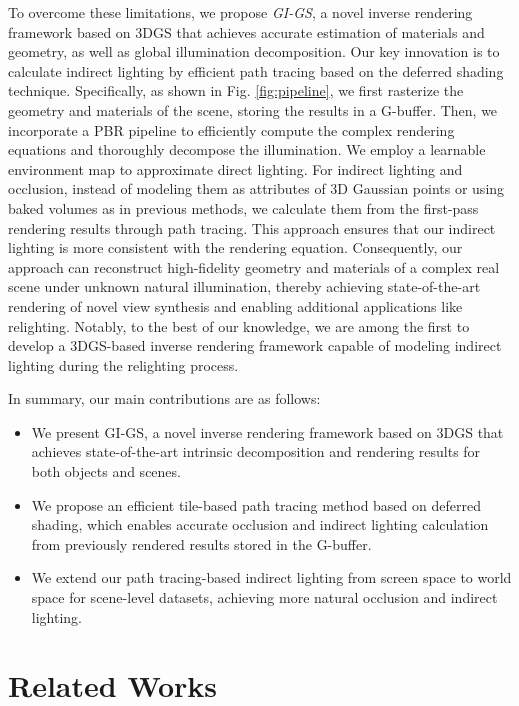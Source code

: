 \documentclass{article} %
\begin{document}
To overcome these limitations, we propose \emph{GI-GS}, a novel inverse rendering framework based on 3DGS that achieves accurate estimation of materials and geometry, as well as global illumination decomposition. Our key innovation is to calculate indirect lighting by efficient path tracing based on the deferred shading technique. Specifically, as shown in Fig. \ref{fig:pipeline}, we first rasterize the geometry and materials of the scene, storing the results in a G-buffer. Then, we incorporate a PBR pipeline to efficiently compute the complex rendering equations and thoroughly decompose the illumination. We employ a learnable environment map to approximate direct lighting. For indirect lighting and occlusion, instead of modeling them as attributes of 3D Gaussian points or using baked volumes as in previous methods, we calculate them from the first-pass rendering results through path tracing. This approach ensures that our indirect lighting is more consistent with the rendering equation. Consequently, our approach can reconstruct high-fidelity geometry and materials of a complex real scene under unknown natural illumination, thereby achieving state-of-the-art rendering of novel view synthesis and enabling additional applications like relighting. Notably, to the best of our knowledge, we are among the first to develop a 3DGS-based inverse rendering framework capable of modeling indirect lighting during the relighting process. 

In summary, our main contributions are as follows:
\begin{itemize}
\item We present GI-GS, a novel inverse rendering framework based on 3DGS that achieves state-of-the-art intrinsic decomposition and rendering results for both objects and scenes.

\item We propose an efficient tile-based path tracing method based on deferred shading, which enables accurate occlusion and indirect lighting calculation from previously rendered results stored in the G-buffer.

\item We extend our path tracing-based indirect lighting from screen space to world space for scene-level datasets, achieving more natural occlusion and indirect lighting.
\end{itemize}

\section{Related Works}
\end{document}
